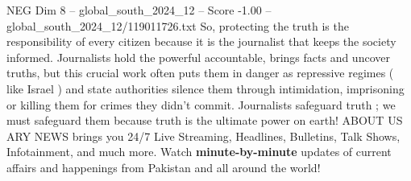 \begin{textsample}{NEG Dim 8 – global\_south\_2024\_12 – Score -1.00 – global\_south\_2024\_12/119011726.txt}
So, protecting the truth is the responsibility of every citizen because it is the journalist that keeps the society informed.
Journalists hold the powerful accountable, brings facts and uncover truths, but this crucial work often puts them in danger as repressive regimes ( like Israel ) and state authorities silence them through intimidation, imprisoning or killing them for crimes they didn't commit.
Journalists safeguard truth ; we must safeguard them because truth is the ultimate power on earth!
ABOUT US ARY NEWS brings you 24/7 Live Streaming, Headlines, Bulletins, Talk Shows, Infotainment, and much more.
Watch \textbf{minute-by-minute} updates of current affairs and happenings from Pakistan and all around the world!

\end{textsample}
